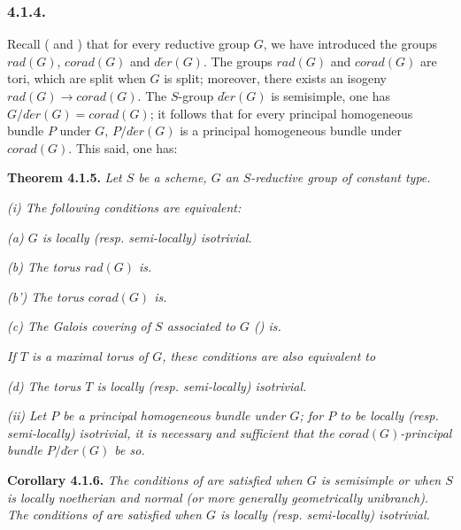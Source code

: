\subsubsection*{4.1.4.}

Recall ( and ) that for every reductive group \(G\), we have introduced the groups \(rad(G)\), \(corad(G)\)
and \(d\acute{e}r(G)\). The groups \(rad(G)\) and \(corad(G)\) are tori, which are split when \(G\) is split; moreover, there
exists an isogeny \(rad(G) \to corad(G)\). The \(S\)-group \(d\acute{e}r(G)\) is semisimple, one has \(G / d\acute{e}r(G) =
corad(G)\); it follows that for every principal homogeneous bundle \(P\) under \(G\), \(P / d\acute{e}r(G)\) is a principal
homogeneous bundle under \(corad(G)\). This said, one has:

\textbf{Theorem 4.1.5.} \emph{Let \(S\) be a scheme, \(G\) an \(S\)-reductive group of constant type.}

\emph{(i) The following conditions are equivalent:}

\emph{(a) \(G\) is locally (resp. semi-locally) isotrivial.}

\emph{(b) The torus \(rad(G)\) is.}

\emph{(b') The torus \(corad(G)\) is.}

\emph{(c) The Galois covering of \(S\) associated to \(G\) () is.}

\emph{If \(T\) is a maximal torus of \(G\), these conditions are also equivalent to}

\emph{(d) The torus \(T\) is locally (resp. semi-locally) isotrivial.}

\emph{(ii) Let \(P\) be a principal homogeneous bundle under \(G\); for \(P\) to be locally (resp. semi-locally) isotrivial, it is
necessary and sufficient that the \(corad(G)\)-principal bundle \(P / d\acute{e}r(G)\) be so.}

\textbf{Corollary 4.1.6.} \emph{The conditions of  are satisfied when \(G\) is semisimple or when \(S\) is locally noetherian and
normal (or more generally geometrically unibranch). The conditions of  are satisfied when \(G\) is locally (resp.
semi-locally) isotrivial.}

